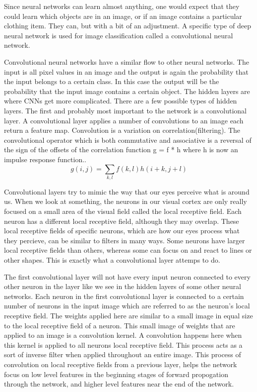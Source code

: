 \documentclass[12pt]{article} %
\begin{document}
	Since neural networks can learn almost anything, one would expect that they could learn which objects are in an image, or if an image contains a particular clothing item. They can, but with a bit of an adjustment. A specific type of deep neural network is used for image classification called a convolutional neural network. 

	Convolutional neural networks have a similar flow to other neural networks. The input is all pixel values in an image and the output is again the probability that the input belongs to a certain class. In this case the output will be the probability that the input image contains a certain object. The hidden layers are where CNNs get more complicated. There are a few possible types of hidden layers. The first and probably most important to the network is a convolutional layer. A convolutional layer applies a number of convolutions to an image each return a feature map\cite{aurelienMachineLearning}. Convolution is a variation on correlation(filtering). The convolutional operator which is both commutative and associative is a reversal of the sign of the offsets of the correlation function  g = f * h where h is now an impulse response function.\cite{szeliski2010computer}. 
\begin{equation}
g(i,j) = \sum_{k,l} f(k, l)h(i + k, j + l)
\end{equation}

	Convolutional layers try to mimic the way that our eyes perceive what is around us. When we look at something, the neurons in our visual cortex are only really focused on a small area of the visual field called the local receptive field. Each neuron has a different local receptive field, although they may overlap. These local receptive fields of specific neurons, which are how our eyes process what they percieve, can be similar to filters in many ways. Some neurons have larger local receptive fields than others, whereas some can focus on and react to lines or other shapes. This is exactly what a convolutional layer attemps to do.\cite{aurelienMachineLearning} 
	
	The first convolutional layer will not have every input neuron connected to every other neuron in the layer like we see in the hidden layers of some other neural networks. Each neuron in the first convolutional layer is connected to a certain number of neurons in the input image which are referred to as the neuron's local receptive field. The weights applied here are similar to a small image in equal size to the local receptive field of a neuron. This small image of weights that are applied to an image is a convolution kernel. A convolution happens here when this kernel is applied to all neurons local receptive field. This process acts as a sort of inverse filter when applied throughout an entire image. This process of convolution on local receptive fields from a previous layer, helps the network focus on low level features in the beginning stages of forward propogation through the network, and higher level features near the end of the network.\cite{aurelienMachineLearning} 
	
\end{document}
